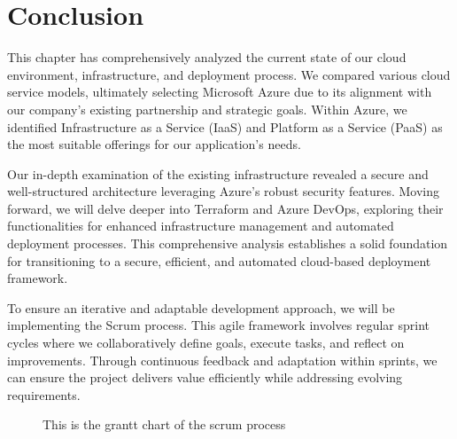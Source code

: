 \section*{Conclusion}
This chapter has comprehensively analyzed the current state of our cloud environment, infrastructure, and deployment process. We compared various cloud service models, ultimately selecting Microsoft Azure due to its alignment with our company's existing partnership and strategic goals. Within Azure, we identified Infrastructure as a Service (IaaS) and Platform as a Service (PaaS) as the most suitable offerings for our application's needs.
\par
Our in-depth examination of the existing infrastructure revealed a secure and well-structured architecture leveraging Azure's robust security features. Moving forward, we will delve deeper into Terraform and Azure DevOps, exploring their functionalities for enhanced infrastructure management and automated deployment processes. This comprehensive analysis establishes a solid foundation for transitioning to a secure, efficient, and automated cloud-based deployment framework.
\par
To ensure an iterative and adaptable development approach, we will be implementing the Scrum process. This agile framework involves regular sprint cycles where we collaboratively define goals, execute tasks, and reflect on improvements. Through continuous feedback and adaptation within sprints, we can ensure the project delivers value efficiently while addressing evolving requirements.

\begin{figure}
    \centering
    \caption{This is the grantt chart of the scrum process} 
    \label{fig:scrum_process}
\end{figure}
